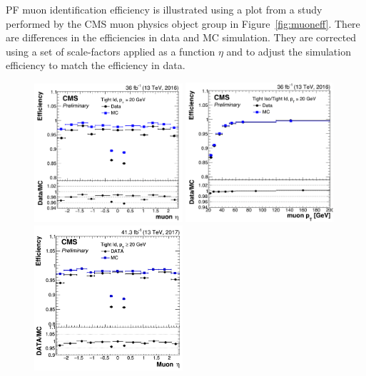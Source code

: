 PF muon identification efficiency is illustrated using a plot from a study performed by the CMS muon physics object group in Figure~\ref{fig:muoneff}. There are differences in the efficiencies in data and MC simulation. They are corrected using a set of scale-factors applied as a function $\eta$ and \pt to adjust the simulation efficiency to match the efficiency in data.

\begin{figure}[!htpb]
  \centering
  \captionsetup{width=0.98\textwidth,justification=centering}
  \includegraphics[width=0.49\textwidth]{plots/chapter5/Eta2016.png}
  \includegraphics[width=0.49\textwidth]{plots/chapter5/Pt2016.png} \\
  \includegraphics[width=0.49\textwidth]{plots/chapter5/Eta2017.png}

\end{figure}
